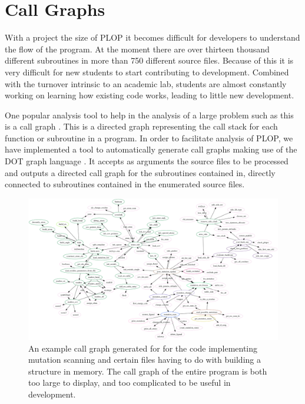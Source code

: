 \section{Call Graphs}
\label{section:unsorted/call_graphs}

With a project the size of PLOP it becomes difficult for developers to understand the flow of the program.
At the moment there are over thirteen thousand different subroutines in more than 750 different source files.
Because of this it is very difficult for new students to start contributing to development.
Combined with the turnover intrinsic to an academic lab, students are almost constantly working on learning how existing code works, leading to little new development.

One popular analysis tool to help in the analysis of a large problem such as this is a call graph \cite{graham1982gprof}.
This is a directed graph representing the call stack for each function or subroutine in a program.
In order to facilitate analysis of PLOP, we have implemented a tool to automatically generate call graphs making use of the DOT graph language \cite{koutsofios1991drawing}.
It accepts as arguments the source files to be processed and outputs a directed call graph for the subroutines contained in, directly connected to subroutines contained in the enumerated source files.

\begin{figure}[h]
    \centering
    \includegraphics[width=1.0\textwidth,height=0.9\textheight,keepaspectratio]{figures/plop_connected_sfdp.png}
    \caption{An example call graph generated for for the code implementing mutation scanning and certain files having to do with building a structure in memory.
The call graph of the entire program is both too large to display, and too complicated to be useful in development.}
    \label{figure:mutation_call_graph}
\end{figure}


